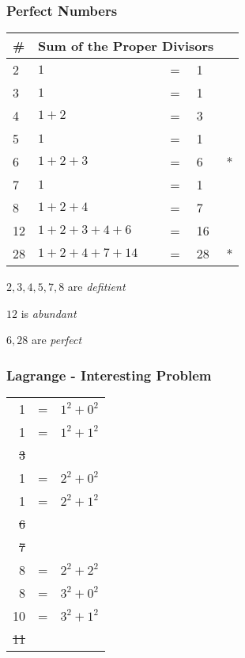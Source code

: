 \documentclass[fleqn,letterpaper,10pt,twoside]{report}
\theoremstyle{plain}
\theoremstyle{definition}
\theoremstyle{remark}
\begin{document}
\subsubsection{Perfect Numbers}

\begin{center}
\begin{tabular}{l|llll}
   \#     &  \multicolumn{3}{c}{Sum of the Proper Divisors} & \\ \hline 
   2     &  \(1\) &  =  &  1 & \\
   3     &  \(1\) &  =  &  1 & \\
   4     &  \(1 + 2\) &  =  &  3 & \\
   5     &  \(1\) &  =  &  1 & \\
   6     &  \(1 + 2 + 3\) &  =  &  6 & * \\
   7     &  \(1\) &  =  &  1 & \\
   8     &  \(1 + 2 + 4\) &  =  &  7 & \\
   12    &  \(1 + 2 + 3 + 4 + 6\) &  =  &  16 & \\
   28    &  \(1 + 2 + 4 + 7 + 14\) &  =  &  28 & * \\
\end{tabular}
\end{center}

\(2,3,4,5,7,8\) are \textit{defitient}

\(12\) is \textit{abundant}

\(6,28\) are \textit{perfect}


\subsubsection{Lagrange - Interesting Problem}
\begin{center}
\begin{tabular}{rcl}
  1 & = & \(1^2 + 0^2\) \\
  1 & = & \(1^2 + 1^2\) \\
   \sout{3} & & \\
  1 & = & \(2^2 + 0^2\) \\
  1 & = & \(2^2 + 1^2\) \\
   \sout{6} & & \\
   \sout{7} & & \\
  8 & = & \(2^2 + 2^2\) \\
  8 & = & \(3^2 + 0^2\) \\
  10 & = & \(3^2 + 1^2\) \\
   \sout{11} & & \\
\end{tabular}
\end{center}
\end{document}
